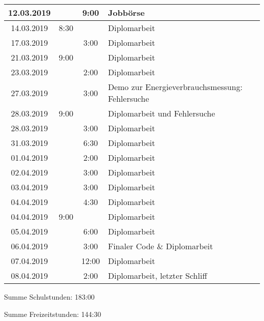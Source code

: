 \begin{longtable}[l]{|c|c|c|p{10cm}|}
12.03.2019  & & 9:00 &  Jobbörse\\\hline
14.03.2019  & 8:30 & &  Diplomarbeit\\\hline
17.03.2019  & & 3:00 &  Diplomarbeit\\\hline
21.03.2019  & 9:00 & &  Diplomarbeit\\\hline
23.03.2019  & & 2:00 &  Diplomarbeit\\\hline
27.03.2019  & & 3:00 &  Demo zur Energieverbrauchsmessung: Fehlersuche\\\hline
28.03.2019  & 9:00 & &  Diplomarbeit und Fehlersuche\\\hline
28.03.2019  & & 3:00 &  Diplomarbeit\\\hline
31.03.2019  & & 6:30 &  Diplomarbeit\\\hline
01.04.2019  & & 2:00 &  Diplomarbeit\\\hline 
02.04.2019  & & 3:00 &  Diplomarbeit\\\hline
03.04.2019  & & 3:00 &  Diplomarbeit\\\hline
04.04.2019  & & 4:30 &  Diplomarbeit\\\hline
04.04.2019  & 9:00 & &  Diplomarbeit\\\hline
05.04.2019  & & 6:00 &  Diplomarbeit\\\hline
06.04.2019  & & 3:00 &  Finaler Code \& Diplomarbeit\\\hline
07.04.2019  & & 12:00 &  Diplomarbeit\\\hline
08.04.2019  & & 2:00 &  Diplomarbeit, letzter Schliff\\\hline
\end{longtable}

Summe Schulstunden: 183:00\par
Summe Freizeitstunden: 144:30